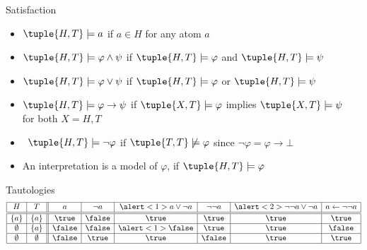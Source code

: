 \begin{frame}{Satisfaction}
  \begin{itemize}
  \item $\tuple{H,T} \models a$ if $a \in H$ \hfill for any atom $a$
  \item $\tuple{H,T} \models \varphi \wedge \psi$ if
    $\tuple{H,T} \models \varphi$
    and
    $\tuple{H,T} \models \psi$
  \item $\tuple{H,T} \models \varphi \vee \psi$ if
    $\tuple{H,T} \models \varphi$
    or
    $\tuple{H,T} \models \psi$

    \smallskip

  \item<2-> $\tuple{H,T} \models \varphi \rightarrow \psi$ if
    $\tuple{X,T} \models \varphi$ implies $\tuple{X,T} \models \psi$
    \\\qquad\qquad
    for both $X=H,T$

    \bigskip

  \item<3>  \ $\tuple{H,T} \models \neg\varphi$ if $\tuple{T,T} \not\models \varphi$
    \hfill since $\neg\varphi = \varphi\to\bot$

    \bigskip

  \item<4-> An interpretation  is a \alert{model} of $\varphi$, if $\tuple{H,T} \models \varphi$
  \end{itemize}
\end{frame}
\begin{frame}{Tautologies}
  \centering
  \bigskip
  \[
    \begin{array}{| c | c || c | c | c | c | c | c |}
      \hline
      H         & T          & a      & \neg a & \alert<1>{a \vee \neg a} & \neg\neg a & \alert<2>{\neg\neg a \vee \neg a} & a \leftarrow \neg\neg a
      \\\hline\hline
      \{ a \}   & \{ a \}    & \true  & \false & \true                    & \true      & \true                             & \true
      \\\hline
      \emptyset & \{ a \}    & \false & \false & \alert<1>{\false}        & \true      & \true                             & \false
      \\\hline
      \emptyset & \emptyset  & \false & \true  & \true                    & \false     & \true                             & \true
      \\\hline
    \end{array}
  \]
\end{frame}

